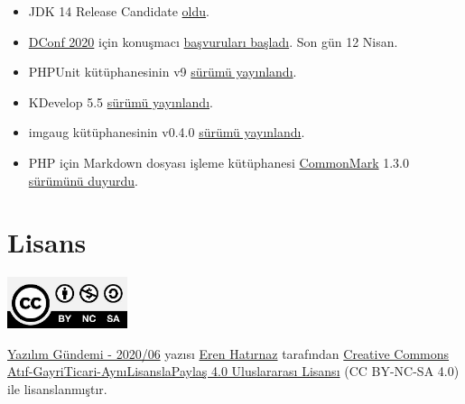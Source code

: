 \documentclass[11pt]{article}
\begin{document}
\begin{itemize}
\item JDK 14 Release Candidate \href{https://mail.openjdk.java.net/pipermail/jdk-dev/2020-February/003885.html}{oldu}.
\item \href{https://dconf.org/2020/}{DConf 2020} için konuşmacı \href{https://dlang.org/blog/2020/02/06/dconf-2020-submission-deadline-early-bird-registration-and-invited-keynote/}{başvuruları başladı}. Son gün 12 Nisan.
\item PHPUnit kütüphanesinin v9 \href{https://phpunit.de/announcements/phpunit-9.html}{sürümü yayınlandı}.
\item KDevelop 5.5 \href{https://www.kdevelop.org/news/kdevelop-550-released}{sürümü yayınlandı}.
\item imgaug kütüphanesinin v0.4.0 \href{https://github.com/aleju/imgaug/releases/tag/0.4.0}{sürümü yayınlandı}.
\item PHP için Markdown dosyası işleme kütüphanesi \href{https://github.com/thephpleague/commonmark}{CommonMark} 1.3.0 \href{https://www.colinodell.com/blog/202002/league-commonmark-130-adds-full-gfm-support}{sürümünü
duyurdu}.
\end{itemize}
\section{Lisans}
\label{sec:org07ba5de}
\begin{center}
\begin{center}
\includegraphics[height=1.5cm]{../../../img/CC_BY-NC-SA_4.0.png}
\end{center}

\href{yazilim-gundemi-2020-06.pdf}{Yazılım Gündemi - 2020/06} yazısı \href{https://erenhatirnaz.github.io}{Eren Hatırnaz} tarafından \href{http://creativecommons.org/licenses/by-nc-sa/4.0/}{Creative Commons
Atıf-GayriTicari-AynıLisanslaPaylaş 4.0 Uluslararası Lisansı} (CC BY-NC-SA 4.0)
ile lisanslanmıştır.
\end{center}
\end{document}
